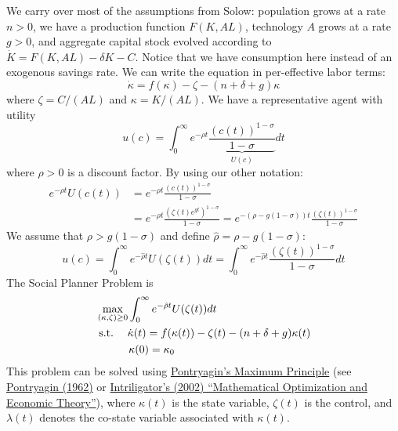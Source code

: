 \documentclass[10pt]{article}
\begin{document}
\begin{model}
	 We carry over most of the assumptions from Solow: population grows at a rate $n > 0$, we have a production function $F(K,AL)$, technology $A$ grows at a rate $g > 0$, and aggregate capital stock evolved according to $\dot{K} = F(K,AL) - \delta K - C$. Notice that we have consumption here instead of an exogenous savings rate. We can write the equation in per-effective labor terms:
	\[
	\dot{\kappa} = f(\kappa) - \zeta - (n + \delta + g)\kappa
	\]
	where $\zeta = C / (AL)$ and $\kappa = K / (AL)$. We have a representative agent with utility
	\[
	u(c) = \int_0^\infty e^{-\rho t} \underbrace{\frac{(c(t))^{1-\sigma}}{1 - \sigma}}_{U(c)} dt
	\]
	where $\rho > 0$ is a discount factor. By using our other notation:
	\begin{align*}
		e^{-\rho t} U(c(t)) &= e^{-\rho t} \frac{(c(t))^{1-\sigma}}{1-\sigma} \\
		&= e^{-\rho t} \frac{(\zeta(t)e^{gt})^{1-\sigma}}{1 - \sigma} = e^{-(\rho - g(1-\sigma))t} \frac{(\zeta(t))^{1-\sigma}}{1-\sigma}
	\end{align*}
	We assume that $\rho > g(1-\sigma)$ and define $\hat{\rho} = \rho - g(1-\sigma)$:
	\[
	u(c) = \int_0^\infty e^{-\hat{\rho}t} U(\zeta(t))dt = \int_0^\infty e^{-\hat{\rho}t} \frac{(\zeta(t))^{1-\sigma}}{1-\sigma} dt
	\]
	The Social Planner Problem is
	\begin{align*}
		& \max_{(\kappa,\zeta) \ge 0} \int_0^\infty e^{-\hat	{\rho}t}U(\zeta(t)) dt \\
		&\;\text{s.t.}\; \quad \dot{\kappa}(t) = f(\kappa(t)) - \zeta(t) - (n + \delta + g)\kappa(t) \\
		&\qquad \quad\kappa(0) = \kappa_0
	\end{align*}
	This problem can be solved using \href{https://en.wikipedia.org/wiki/Pontryagin\%27s_maximum_principle}{Pontryagin's Maximum Principle} (see \href{https://www.routledge.com/Mathematical-Theory-of-Optimal-Processes/Pontryagin/p/book/9782881240775}{Pontryagin (1962)} or \href{https://epubs.siam.org/doi/10.1137/1.9780898719215}{Intriligator's (2002) ``Mathematical Optimization and Economic Theory''}), where $\kappa(t)$ is the state variable, $\zeta(t)$ is the control, and $\lambda(t)$ denotes the co-state variable associated with $\kappa(t)$.
\end{model}
\end{document}
